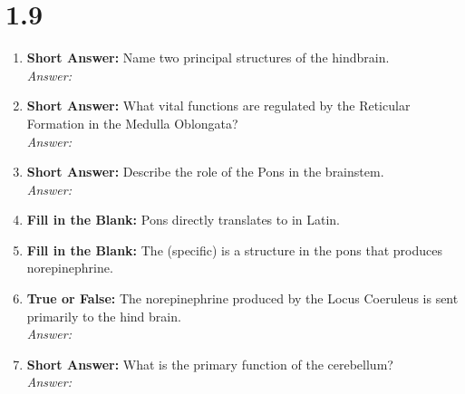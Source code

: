 \section*{1.9 \squigglyline}
\begin{enumerate}[label=\textbf{Q1.9.\arabic*}]
      \item \textbf{Short Answer:} Name two principal structures of the hindbrain. \\
            \textit{Answer:} \\%

      \item \textbf{Short Answer:} What vital functions are regulated by the Reticular Formation in the Medulla Oblongata? \\
            \textit{Answer:} \\ %

      \item \textbf{Short Answer:} Describe the role of the Pons in the brainstem. \\
            \textit{Answer:} %

      \item \textbf{Fill in the Blank:} Pons directly translates to \underline{\hspace{3cm}} in Latin. \\

      \item \textbf{Fill in the Blank:} The \underline{\hspace{3cm}} (specific) is a structure in the pons that produces norepinephrine. \\

      \item \textbf{True or False:} The norepinephrine produced by the Locus Coeruleus is sent primarily to the hind brain. \\
            \textit{Answer:} %

      \item \textbf{Short Answer:} What is the primary function of the cerebellum? \\
            \textit{Answer:} %


\end{enumerate}
